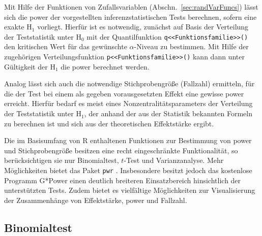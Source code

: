 Mit Hilfe der Funktionen von Zufallsvariablen (Abschn.\ \ref{sec:randVarFuncs}) lässt sich die power der vorgestellten inferenzstatistischen Tests berechnen, sofern eine exakte $\text{H}_{1}$ vorliegt. Hierfür ist es notwendig, zunächst auf Basis der Verteilung der Teststatistik unter $\text{H}_{0}$ mit der Quantilfunktion \lstinline!q<<Funktionsfamilie>>()! den kritischen Wert für das gewünschte $\alpha$-Niveau zu bestimmen. Mit Hilfe der zugehörigen Verteilungsfunktion \lstinline!p<<Funktionsfamilie>>()! kann dann unter Gültigkeit der $\text{H}_{1}$ die power berechnet werden.

Analog lässt sich auch die notwendige Stichprobengröße (Fallzahl) ermitteln, für die der Test bei einem als gegeben vorausgesetzten Effekt eine gewisse power erreicht. Hierfür bedarf es meist eines Nonzentralitätsparameters der Verteilung der Teststatistik unter $\text{H}_{1}$, der anhand der aus der Statistik bekannten Formeln zu berechnen ist und sich aus der theoretischen Effektstärke ergibt.

Die im Basisumfang von R enthaltenen Funktionen zur Bestimmung von power und Stichprobengröße besitzen eine recht eingeschränkte Funktionalität, so berücksichtigen sie nur Binomialtest, $t$-Test und Varianzanalyse. Mehr Möglichkeiten bietet das Paket \lstinline!pwr! \cite{Champely2007}. Insbesondere besitzt jedoch das kostenlose Programm G*Power \cite{Faul2007} einen deutlich breiteren Einsatzbereich hinsichtlich der unterstützten Tests. Zudem bietet es vielfältige Möglichkeiten zur Visualisierung der Zusammenhänge von Effektstärke, power und Fallzahl.

\subsection{Binomialtest}

